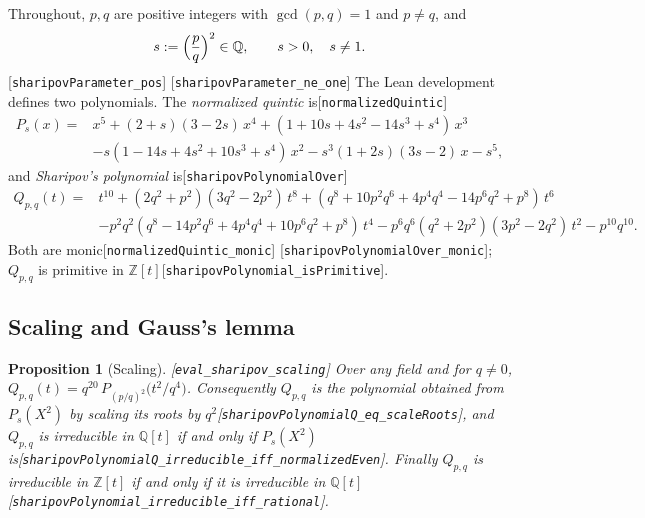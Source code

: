 \documentclass[10pt]{article}
\newtheorem{proposition}[theorem]{Proposition}
\theoremstyle{definition}
\theoremstyle{remark}
\newcommand{\Q}{\mathbb{Q}}
\newcommand{\Z}{\mathbb{Z}}
\newcommand{\leanref}[1]{{\scriptsize\textup{[\texttt{#1}]}}\allowbreak}
\begin{document}
Throughout, $p,q$ are positive integers with $\gcd(p,q)=1$ and $p\ne q$, and
\[
 s:=\Bigl(\frac{p}{q}\Bigr)^2\in\Q,\qquad s>0,\quad s\ne1 .
\]
\leanref{sharipov\allowbreak Parameter\_\allowbreak pos} \leanref{sharipov\allowbreak Parameter\_\allowbreak ne\_\allowbreak one}
The Lean development defines two polynomials.  The \emph{normalized quintic}
is\leanref{normalized\allowbreak Quintic}
\begin{equation}\label{eq:Ps}
\begin{aligned}
P_s(x)={}&x^5+(2+s)(3-2s)\,x^4+(1+10s+4s^2-14s^3+s^4)\,x^3\\
&-s(1-14s+4s^2+10s^3+s^4)\,x^2-s^3(1+2s)(3s-2)\,x-s^5 ,
\end{aligned}
\end{equation}
and \emph{Sharipov's polynomial} is\leanref{sharipov\allowbreak Polynomial\allowbreak Over}
\begin{equation}\label{eq:Qpq}
\begin{aligned}
Q_{p,q}(t)={}&t^{10}+(2q^2+p^2)(3q^2-2p^2)\,t^8
+(q^8+10p^2q^6+4p^4q^4-14p^6q^2+p^8)\,t^6\\
&-p^2q^2(q^8-14p^2q^6+4p^4q^4+10p^6q^2+p^8)\,t^4
-p^6q^6(q^2+2p^2)(3p^2-2q^2)\,t^2-p^{10}q^{10}.
\end{aligned}
\end{equation}
Both are monic\leanref{normalized\allowbreak Quintic\_\allowbreak monic} \leanref{sharipov\allowbreak Polynomial\allowbreak Over\_\allowbreak monic};
$Q_{p,q}$ is primitive in $\Z[t]$\leanref{sharipov\allowbreak Polynomial\_\allowbreak is\allowbreak Primitive}.

\subsection{Scaling and Gauss's lemma}

\begin{proposition}[Scaling]\label{prop:scaling}
\leanref{eval\_\allowbreak sharipov\_\allowbreak scaling}
Over any field and for $q\ne0$,
$Q_{p,q}(t)=q^{20}\,P_{(p/q)^2}\bigl(t^2/q^4\bigr)$.
Consequently $Q_{p,q}$ is the polynomial obtained from $P_s(X^2)$ by scaling
its roots by $q^2$\leanref{sharipov\allowbreak Polynomial\allowbreak Q\_\allowbreak eq\_\allowbreak scale\allowbreak Roots}, and
$Q_{p,q}$ is irreducible in $\Q[t]$ if and only if $P_s(X^2)$
is\leanref{sharipov\allowbreak Polynomial\allowbreak Q\_\allowbreak irreducible\_\allowbreak iff\_\allowbreak normalized\allowbreak Even}.
Finally $Q_{p,q}$ is irreducible in $\Z[t]$ if and only if it is irreducible
in $\Q[t]$\leanref{sharipov\allowbreak Polynomial\_\allowbreak irreducible\_\allowbreak iff\_\allowbreak rational}.
\end{proposition}
\end{document}
